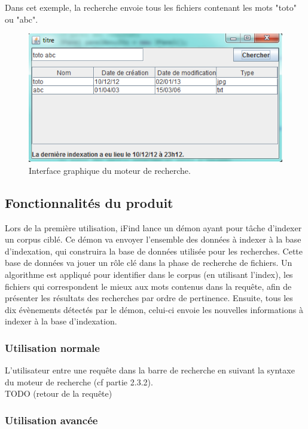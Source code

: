 Dans cet exemple, la recherche envoie tous les fichiers contenant les mots
"toto" ou "abc".

\begin{figure}[!h]
\includegraphics[scale=0.7]{rechercheSimple.png}
\caption{Interface graphique du moteur de recherche.}
\end{figure}

\subsection{Fonctionnalités du produit}
Lors de la première utilisation, iFind lance un démon ayant pour tâche d'indexer
un corpus ciblé. Ce démon va envoyer l'ensemble des données à indexer
à la base d'indexation, qui construira la base de données utilisée pour les 
recherches. Cette base de données va jouer un rôle clé dans la phase de 
recherche de fichiers.
Un algorithme est appliqué pour identifier dans le corpus (en utilisant 
l'index), les fichiers
qui correspondent le mieux aux mots contenus dans la requête, afin de présenter
les résultats des recherches par ordre de pertinence. 
Ensuite, tous les dix évènements détectés par le démon, celui-ci
envoie les nouvelles informations à indexer à la base d'indexation.

\subsubsection{Utilisation normale}
L'utilisateur entre une requête dans la barre de recherche en suivant la syntaxe
du moteur de recherche (cf partie 2.3.2).\\
TODO (retour de la requête)


\subsubsection{Utilisation avancée}

